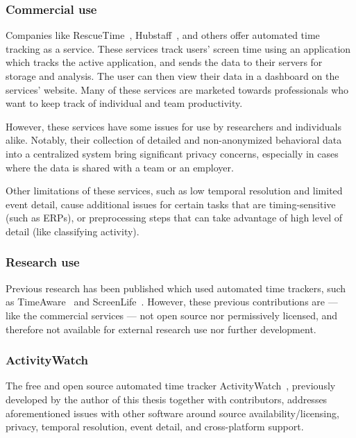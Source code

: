     \subsubsection*{Commercial use}

        Companies like RescueTime~\cite{noauthor_rescuetime_nodate}, Hubstaff~\cite{noauthor_hubstaff_nodate}, and others offer automated time tracking as a service. These services track users' screen time using an application which tracks the active application, and sends the data to their servers for storage and analysis. The user can then view their data in a dashboard on the services' website. Many of these services are marketed towards professionals who want to keep track of individual and team productivity.

        However, these services have some issues for use by researchers and individuals alike. Notably, their collection of detailed and non-anonymized behavioral data into a centralized system bring significant privacy concerns, especially in cases where the data is shared with a team or an employer.

        Other limitations of these services, such as low temporal resolution and limited event detail, cause additional issues for certain tasks that are timing-sensitive (such as ERPs), or preprocessing steps that can take advantage of high level of detail (like classifying activity).

    \subsubsection*{Research use}

        Previous research has been published which used automated time trackers, such as TimeAware~\cite{kim_timeaware_2016} and ScreenLife~\cite{rooksby_personal_2016}. However, these previous contributions are --- like the commercial services --- not open source nor permissively licensed, and therefore not available for external research use nor further development.

    \subsubsection*{ActivityWatch}

        The free and open source automated time tracker ActivityWatch~\cite{bjareholt_activitywatch_2020}, previously developed by the author of this thesis together with contributors, addresses aforementioned issues with other software around source availability/licensing, privacy, temporal resolution, event detail, and cross-platform support.

